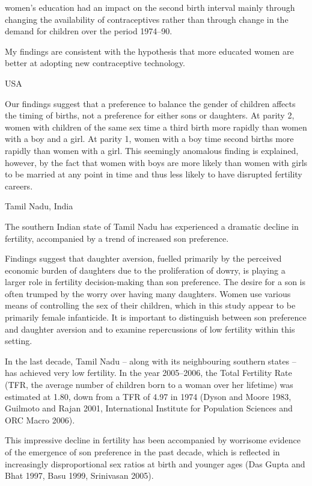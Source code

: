 women’s education had an impact on the second birth interval mainly through changing the availability of contraceptives rather than through change in the demand for children over the period 1974–90.

My ﬁndings are consistent with the hypothesis that more educated women are better at adopting new contraceptive technology.

\citep{Teachman1989}

USA

Our findings suggest
that a preference to balance the gender of children affects the timing of births, not a
preference for either sons or daughters. At parity 2, women with children of the same
sex time a third birth more rapidly than women with a boy and a girl. At parity 1,
women with a boy time second births more rapidly than women with a girl. This
seemingly anomalous finding is explained, however, by the fact that women with boys
are more likely than women with girls to be married at any point in time and thus
less likely to have disrupted fertility careers.

\citep{DiamondSmith2008}

Tamil Nadu, India

The southern Indian state of Tamil Nadu has experienced a dramatic decline in fertility, accompanied by a trend of increased son preference.

Findings suggest that daughter aversion, fuelled primarily by the perceived economic burden of daughters due to the proliferation of dowry, is playing a larger role in fertility decision-making than son preference. The desire for a son is often trumped by the worry over having many daughters. Women use various means of controlling the sex of their children, which in this study appear to be primarily female infanticide. It is important to distinguish between son preference and daughter aversion and to examine repercussions of low fertility within this setting.

In the last decade, Tamil Nadu – along with its neighbouring southern states – has achieved very low fertility. In the year 2005–2006, the Total Fertility Rate (TFR, the average number of children born to a woman over her lifetime) was estimated at 1.80, down from a TFR of 4.97 in 1974 (Dyson and Moore 1983, Guilmoto and Rajan 2001, International Institute for Population Sciences and ORC Macro 2006).

This impressive decline in fertility has been accompanied by worrisome evidence of the emergence of son preference in the past decade, which is reflected in increasingly disproportional sex ratios at birth and younger ages (Das Gupta and Bhat 1997, Basu 1999, Srinivasan 2005).

